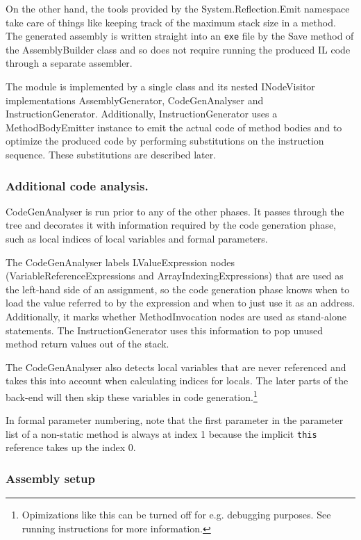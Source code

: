 \documentclass[a4paper,11pt]{article}
\begin{document}
On the other hand, the tools provided by the System.Reflection.Emit namespace take care of things like keeping track of the maximum stack size in a method. The generated assembly is written straight into an \verb,exe, file by the Save method of the AssemblyBuilder class and so does not require running the produced IL code through a separate assembler.

The module is implemented by a single class and its nested INodeVisitor implementations AssemblyGenerator, CodeGenAnalyser and InstructionGenerator. Additionally, InstructionGenerator uses a MethodBodyEmitter instance to emit the actual code of method bodies and to optimize the produced code by performing substitutions on the instruction sequence. These substitutions are described later.

\subsubsection{Additional code analysis.}

CodeGenAnalyser is run prior to any of the other phases. It passes through the tree and decorates it with information required by the code generation phase, such as local indices of local variables and formal parameters.

The CodeGenAnalyser labels LValueExpression nodes (VariableReferenceExpressions and ArrayIndexingExpressions) that are used as the left-hand side of an assignment, so the code generation phase knows when to load the value referred to by the expression and when to just use it as an address. Additionally, it marks whether MethodInvocation nodes are used as stand-alone statements. The InstructionGenerator uses this information to pop unused method return values out of the stack.

The CodeGenAnalyser also detects local variables that are never referenced and takes this into account when calculating indices for locals. The later parts of the back-end will then skip these variables in code generation.\footnote{Opimizations like this can be turned off for e.g. debugging purposes. See running instructions for more information.}

In formal parameter numbering, note that the first parameter in the parameter list of a non-static method is always at index 1 because the implicit \verb,this, reference takes up the index 0.

\subsubsection{Assembly setup}
\end{document}
